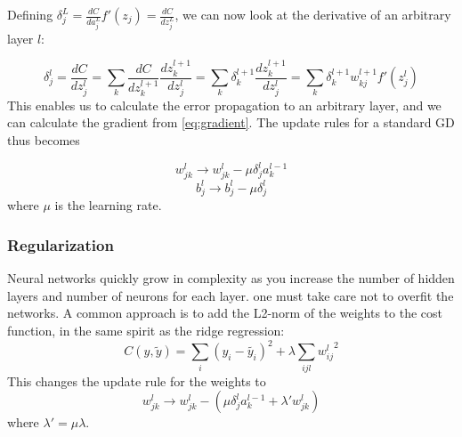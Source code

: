 Defining $\delta_j^L = \frac{dC}{da_j^L} f'(z_j) = \frac{dC}{dz_j^L}$, we can now look at the derivative of an arbitrary layer $l$:

\begin{equation}\label{eq:Backward}
   \delta_j^l = \frac{dC}{dz^l_j} = \sum_k \frac{dC}{dz^{l+1}_k} \frac{dz^{l+1}_k}{dz^{l}_j} = \sum_k \delta_k^{l+1} \frac{dz^{l+1}_k}{dz^{l}_j}
   = \sum_k \delta_k^{l+1} w_{kj}^{l+1}f'(z^l_j)
\end{equation}
This enables us to calculate the error propagation to an arbitrary layer, and we can calculate the gradient from \autoref{eq:gradient}. The update rules for a standard GD thus becomes

\begin{equation}\label{eq:grad step}
    w^l_{jk} \rightarrow w^l_{jk} - \mu \delta_j^l a_k^{l-1}  
\end{equation}
\begin{equation*}\label{}
    b^l_{j} \rightarrow b^l_{j} - \mu \delta_j^l 
\end{equation*}
where $\mu$ is the learning rate.

\subsubsection{Regularization}

Neural networks quickly grow in complexity as you increase the number of hidden layers and number of neurons for each layer. one must take care not to overfit the networks. A common approach is to add the L2-norm of the weights to the cost function, in the same spirit as the ridge regression:
\begin{equation*}
    C(y, \tilde{y}) = \sum_i(y_i - \tilde{y_i})^2 + \lambda \sum_{ijl}{w^l_{ij}}^2
\end{equation*}
This changes the update rule for the weights to
\begin{equation}\label{eq:grad step}
    w^l_{jk} \rightarrow w^l_{jk} - (\mu \delta_j^l a_k^{l-1} + \lambda'w^l_{jk}) 
\end{equation}
where $\lambda' = \mu \lambda$.
